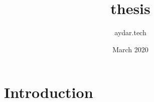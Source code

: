 \documentclass{article}
\title{thesis}
\author{aydar.tech }
\date{March 2020}
\begin{document}
\maketitle

\section{Introduction}
\end{document}
